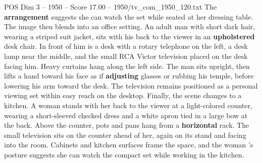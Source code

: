 \begin{textsample}{POS Dim 3 – 1950 – Score 17.00 – 1950/tv\_com\_1950\_120.txt}
The \textbf{arrangement} suggests she can watch the set while seated at her dressing table.
The image then blends into an office setting.
An adult man with short dark hair, wearing a striped suit jacket, sits with his back to the viewer in an \textbf{upholstered} desk chair.
In front of him is a desk with a rotary telephone on the left, a desk lamp near the middle, and the small RCA Victor television placed on the desk facing him.
Heavy curtains hang along the left side.
The man sits upright, then lifts a hand toward his face as if \textbf{adjusting} glasses or rubbing his temple, before lowering his arm toward the desk.
The television remains positioned as a personal viewing set within easy reach on the desktop.
Finally, the scene changes to a kitchen.
A woman stands with her back to the viewer at a light-colored counter, wearing a short-sleeved checked dress and a white apron tied in a large bow at the back.
Above the counter, pots and pans hang from a \textbf{horizontal} rack.
The small television sits on the counter ahead of her, again on its stand and facing into the room.
Cabinets and kitchen surfaces frame the space, and the woman ’s posture suggests she can watch the compact set while working in the kitchen.

\end{textsample}
